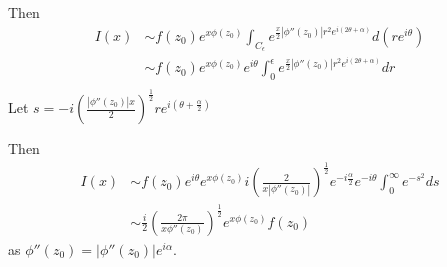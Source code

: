 \documentclass[a4paper]{article}
\begin{document}
Then
 \begin{align*}
	 I(x) &\sim f(z_0) e^{x\phi(z_0)} \int_{C_{\epsilon}} e^{\frac{x}{2} |\phi''(z_0)| r^2 e^{i(2\theta + \alpha)}} d(re^{i\theta}) \\
	 &\sim  f(z_0) e^{x\phi(z_0)} e^{i\theta}\int_{0}^{\epsilon} e^{\frac{x}{2} |\phi''(z_0)| r^2 e^{i(2\theta + \alpha)}} dr \\
\end{align*}
Let $s = -i \left( \frac{|\phi''(z_0)| x}{2} \right)^{\frac{1}{2}} re^{i(\theta + \frac{\alpha}{2})} $ 

Then 
\begin{align*}
	I(x) &\sim f(z_0) e^{i\theta} e^{x\phi(z_0)} i \left( \frac{2}{x |\phi''(z_0)|} \right)^{\frac{1}{2}} e^{-i\frac{\alpha}{2}} e^{-i\theta} \int_{0}^{\infty} e^{-s^2} ds \\
	&\sim  \frac{i}{2} \left( \frac{2\pi}{x\phi''(z_0)} \right)^{\frac{1}{2}} e^{x\phi(z_0)} f(z_0)
\end{align*} as $\phi''(z_0) = |\phi''(z_0)| e^{i\alpha}$. 
\end{document}

